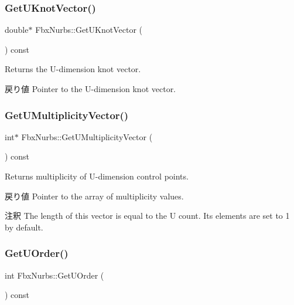 \subsubsection{\texorpdfstring{Get\+U\+Knot\+Vector()}{GetUKnotVector()}}
{\footnotesize\ttfamily double$\ast$ Fbx\+Nurbs\+::\+Get\+U\+Knot\+Vector (\begin{DoxyParamCaption}{ }\end{DoxyParamCaption}) const}

Returns the U-\/dimension knot vector. \begin{DoxyReturn}{戻り値}
Pointer to the U-\/dimension knot vector. 
\end{DoxyReturn}
\mbox{\label{class_fbx_nurbs_a0ee516428900821e7d97aa745753d0b4}} 
\subsubsection{\texorpdfstring{Get\+U\+Multiplicity\+Vector()}{GetUMultiplicityVector()}}
{\footnotesize\ttfamily int$\ast$ Fbx\+Nurbs\+::\+Get\+U\+Multiplicity\+Vector (\begin{DoxyParamCaption}{ }\end{DoxyParamCaption}) const}

Returns multiplicity of U-\/dimension control points. \begin{DoxyReturn}{戻り値}
Pointer to the array of multiplicity values. 
\end{DoxyReturn}
\begin{DoxyRemark}{注釈}
The length of this vector is equal to the U count. Its elements are set to 1 by default. 
\end{DoxyRemark}
\mbox{\label{class_fbx_nurbs_a7312be9277b3ca4bf10a723585bd6663}} 
\subsubsection{\texorpdfstring{Get\+U\+Order()}{GetUOrder()}}
{\footnotesize\ttfamily int Fbx\+Nurbs\+::\+Get\+U\+Order (\begin{DoxyParamCaption}{ }\end{DoxyParamCaption}) const}

